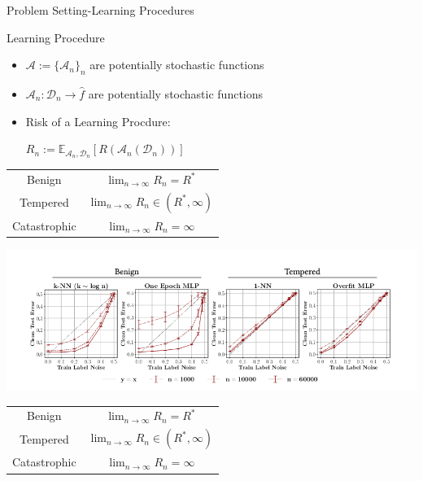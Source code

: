\documentclass[aspectratio=169]{beamer}
\newcommand{\E}{\mathbb{E}}
\newcommand{\D}{\mathcal{D}}
\newcommand{\A}{\mathcal{A}}
\begin{document}
\begin{frame}{Problem Setting-Learning Procedures}
  {
  \begin{minipage}{0.5\textwidth}
     \color{Pink} Learning Procedure \color{Black}
    \begin{itemize}
      \item $\A:=\{\A_n\}_n$ are potentially stochastic functions 
      \item $\A_n:\D_n\to\hat{f}$ are potentially stochastic functions 
      \item \color{Pink} Risk of a Learning Procdure:

      \centering
      $R_n:=\E_{\A_n,\D_n}[R(\A_n(\D_n))]$
    \end{itemize}
    
  \end{minipage}%
  \begin{minipage}{0.5\textwidth}
    \centering
    \begin{tabular}{cc}
      \hline
      Benign        & $\lim_{n\to\infty}R_n=R^*$ \\
      Tempered      & $\lim_{n\to\infty}R_n\in(R^*,\infty)$ \\
      Catastrophic  & $\lim_{n\to\infty}R_n=\infty$ \\
      \hline
    \end{tabular}
  \end{minipage}
  }
  {
  \begin{minipage}{\textwidth}
    \includegraphics[width=\textwidth]{Figures/noise_profiles}
  \end{minipage}
  \begin{minipage}{\textwidth}
    \centering
    \begin{tabular}{cc}
      \hline
      Benign        & $\lim_{n\to\infty}R_n=R^*$ \\
      Tempered      & $\lim_{n\to\infty}R_n\in(R^*,\infty)$ \\
      Catastrophic  & $\lim_{n\to\infty}R_n=\infty$ \\
      \hline
    \end{tabular}
  \end{minipage}
  }
\end{frame}
\end{document}
